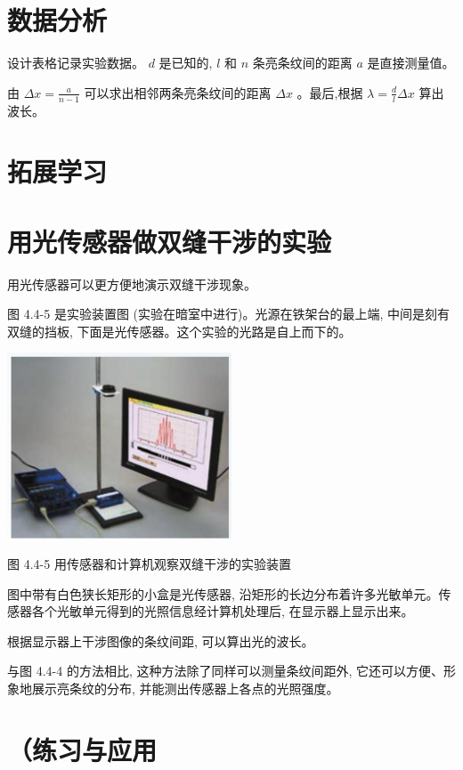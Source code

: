 \documentclass[10pt]{article}
\begin{document}
\section*{数据分析}

设计表格记录实验数据。 \(d\) 是已知的, \(l\) 和 \(n\) 条亮条纹间的距离 \(a\) 是直接测量值。

由 \({\Delta x} = \frac{a}{n - 1}\) 可以求出相邻两条亮条纹间的距离 \({\Delta x}\) 。最后,根据 \(\lambda = \frac{d}{l}{\Delta x}\) 算出波长。

\section*{拓展学习}

\section*{用光传感器做双缝干涉的实验}

用光传感器可以更方便地演示双缝干涉现象。

图 4.4-5 是实验装置图 (实验在暗室中进行)。光源在铁架台的最上端, 中间是刻有双缝的挡板, 下面是光传感器。这个实验的光路是自上而下的。

\begin{center}
\includegraphics[max width=0.5\textwidth]{images/01910e4c-ebb8-7d2c-8f2f-2375bc1d2d12_108_785097.jpg}
\end{center}

图 4.4-5 用传感器和计算机观察双缝干涉的实验装置

图中带有白色狭长矩形的小盒是光传感器, 沿矩形的长边分布着许多光敏单元。传感器各个光敏单元得到的光照信息经计算机处理后, 在显示器上显示出来。

根据显示器上干涉图像的条纹间距, 可以算出光的波长。

与图 4.4-4 的方法相比, 这种方法除了同样可以测量条纹间距外, 它还可以方便、形象地展示亮条纹的分布, 并能测出传感器上各点的光照强度。

\section*{（练习与应用}
\end{document}

